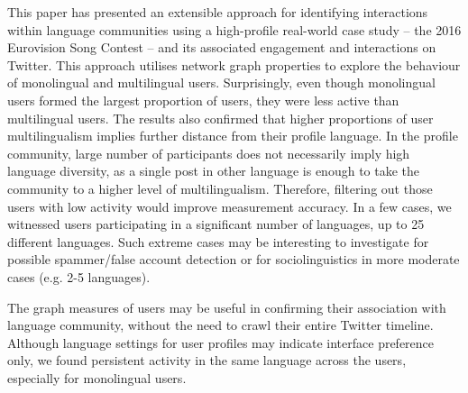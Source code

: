 \documentclass{llncs}
\begin{document}
This paper has presented an extensible approach for identifying
interactions within language communities using a high-profile
real-world case study -- the 2016 Eurovision Song Contest -- and its
associated engagement and interactions on Twitter. This approach
utilises network graph properties to explore the behaviour of
monolingual and multilingual users. Surprisingly, even though
monolingual users formed the largest proportion of users, they were
less active than multilingual users.  The results also confirmed that
higher proportions of user multilingualism implies further distance
from their profile language.  In the profile community, large number
of participants does not necessarily imply high language diversity, as
a single post in other language is enough to take the community to a
higher level of multilingualism.  Therefore, filtering out those users
with low activity would improve measurement accuracy. In a few cases,
we witnessed users participating in a significant number of languages,
up to 25 different languages. Such extreme cases may be interesting to
investigate for possible spammer/false account detection or for
sociolinguistics in more moderate cases (e.g. 2-5 languages).

The graph measures of users may be useful in confirming their
association with language community, without the need to crawl their
entire Twitter timeline.  Although language settings for user profiles
may indicate interface preference only, we found persistent activity
in the same language across the users, especially for monolingual
users.


\end{document}
